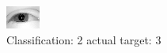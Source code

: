 \begin{figure}[h!]
\begin{center}
\includegraphics[width=0.60\columnwidth]{figures/ID2390_class_2_target_3.png}
\end{center}
\caption{ Classification: 2 actual target: 3}
\label{fig:ID2390_class_2_target_3}
\end{figure}
